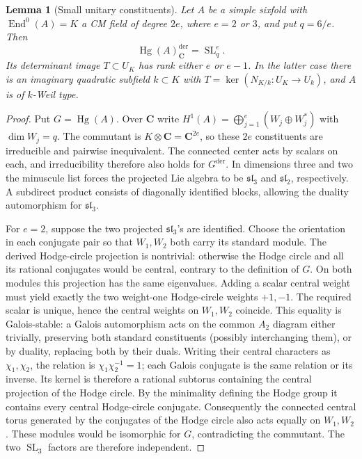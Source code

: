 \documentclass[10pt,reqno]{article}
\theoremstyle{emphasizedplain}
\theoremstyle{emphasizeddefinition}
\theoremstyle{emphasizeddefinition}
\newtheorem{prelemma}{Lemma}
\DeclareMathOperator{\End}{End}
\DeclareMathOperator{\Hg}{Hg}
\DeclareMathOperator{\SL}{SL}
\newcommand{\C}{\mathbf C}
\newcommand{\dd}{\mathrm{der}}
\begin{document}
\begin{prelemma}[Small unitary constituents]\label{p:smallunitary}
Let $A$ be a simple sixfold with $\End^0(A)=K$ a CM field of degree
$2e$, where $e=2$ or $3$, and put $q=6/e$. Then
\[
 \Hg(A)_\C^{\dd}=\SL_q^e.
\]
Its determinant image $T\subset U_K$ has rank either $e$ or $e-1$.
In the latter case there is an imaginary quadratic subfield $k\subset K$
with $T=\ker(N_{K/k}:U_K\to U_k)$, and $A$ is of $k$-Weil type.
\end{prelemma}
\begin{proof}
Put $G=\Hg(A)$. Over $\C$ write
$H^1(A)=\bigoplus_{j=1}^e(W_j\oplus W_j^*)$ with $\dim W_j=q$.
The commutant is $K\otimes\C=\C^{2e}$, so these $2e$ constituents
are irreducible and pairwise inequivalent. The connected center acts by
scalars on each, and irreducibility therefore also holds for $G^{\dd}$.
In dimensions three and two the minuscule list forces the projected
Lie algebra to be $\mathfrak{sl}_3$ and $\mathfrak{sl}_2$, respectively.
A subdirect product consists of diagonally identified blocks, allowing
the duality automorphism for $\mathfrak{sl}_3$.

For $e=2$, suppose the two projected $\mathfrak{sl}_3$'s are identified.
Choose the orientation in each conjugate pair so that $W_1,W_2$ both
carry its standard module. The derived Hodge-circle projection is
nontrivial: otherwise the Hodge circle and all its rational conjugates
would be central, contrary to the definition of $G$. On both modules
this projection has the same eigenvalues. Adding a scalar central
weight must yield exactly the two weight-one Hodge-circle weights
$+1,-1$. The required scalar is unique, hence the central weights on
$W_1,W_2$ coincide. This equality is Galois-stable: a Galois automorphism
acts on the common $A_2$ diagram either trivially, preserving both
standard constituents (possibly interchanging them), or by duality,
replacing both by their duals. Writing their central characters as
$\chi_1,\chi_2$, the relation is $\chi_1\chi_2^{-1}=1$; each
Galois conjugate is the same relation or its inverse. Its kernel is
therefore a rational subtorus containing the central projection of
the Hodge circle. By the minimality defining the Hodge group it
contains every central Hodge-circle conjugate. Consequently the connected central torus generated by the conjugates
of the Hodge circle also acts equally on $W_1,W_2$. These modules
would be isomorphic for $G$, contradicting the commutant. The two
$\SL_3$ factors are therefore independent.


\end{proof}
\end{document}
